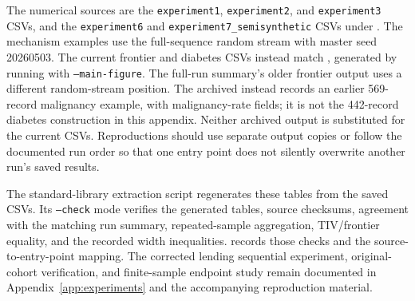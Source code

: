 The numerical sources are the \texttt{experiment1}, \texttt{experiment2}, and
\texttt{experiment3} CSVs, and the \texttt{experiment6} and
\texttt{experiment7\_semisynthetic} CSVs under .
The mechanism examples use the full-sequence random stream with master seed
20260503. The current frontier and diabetes CSVs instead match
, generated by running
 with
\texttt{--main-figure}. The full-run summary's older frontier output uses a different random-stream
position. The archived  instead records an
earlier 569-record malignancy example, with malignancy-rate fields; it is not
the 442-record diabetes construction in this appendix. Neither archived output
is substituted for the current CSVs.
Reproductions should use separate output copies or follow the documented run
order so that one entry point does not silently overwrite another run's saved
results.

The standard-library extraction script
 regenerates these tables
from the saved CSVs. Its \texttt{--check} mode verifies the generated tables,
source checksums, agreement with the matching run summary, repeated-sample
aggregation, TIV/frontier equality, and the recorded width inequalities.
 records those checks and the
source-to-entry-point mapping. The corrected lending sequential experiment,
original-cohort verification, and finite-sample endpoint study remain documented
in Appendix~\ref{app:experiments} and the accompanying reproduction material.

